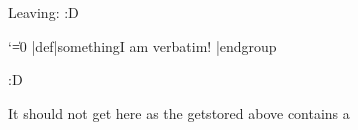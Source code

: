 



\scontents[store-env=another]
Leaving:
\aftergroup\bye :D
\endscontents

\scontents[store-env=test]
\begingroup
  \catcode`\|=0
  |def|something{I am verbatim!}
|endgroup
\something
\endscontents

\scontents[store-env=test]
\hello :D
\endscontents




It should not get here as the getstored above contains a \bye
